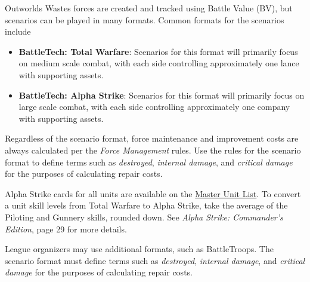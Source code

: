 Outworlds Wastes forces are created and tracked using Battle Value (BV), but scenarios can be played in many formats.
Common formats for the scenarios include

\begin{itemize}

\item {\bfseries BattleTech: Total Warfare}: Scenarios for this format will primarily focus on medium scale combat, with each side controlling approximately one lance with supporting assets.

\item {\bfseries BattleTech: Alpha Strike}: Scenarios for this format will primarily focus on large scale combat, with each side controlling approximately one company with supporting assets.

\end{itemize}

Regardless of the scenario format, force maintenance and improvement costs are always calculated per the \emph{Force Management} rules.
Use the rules for the scenario format to define terms such as \emph{destroyed}, \emph{internal damage}, and \emph{critical damage} for the purposes of calculating repair costs.

Alpha Strike cards for all units are available on the \href{http://www.masterunitlist.info}{Master Unit List}.
To convert a unit skill levels from Total Warfare to Alpha Strike, take the average of the Piloting and Gunnery skills, rounded down.
See \emph{Alpha Strike: Commander's Edition}, page 29 for more details.

League organizers may use additional formats, such as BattleTroops.
The scenario format must define terms such as \emph{destroyed}, \emph{internal damage}, and \emph{critical damage} for the purposes of calculating repair costs.
